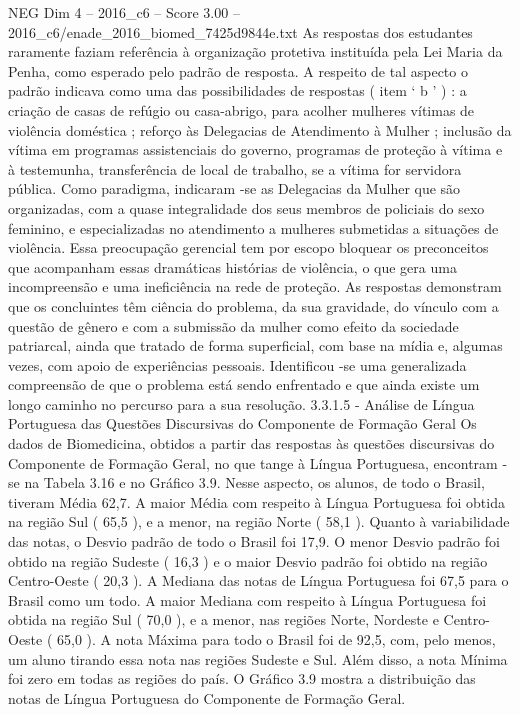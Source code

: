 \begin{textsample}{NEG Dim 4 – 2016\_c6 – Score 3.00 – 2016\_c6/enade\_2016\_biomed\_7425d9844e.txt}
As respostas dos estudantes raramente faziam referência à organização protetiva instituída pela Lei Maria da Penha, como esperado pelo padrão de resposta.
A respeito de tal aspecto o padrão indicava como uma das possibilidades de respostas ( item ‘ b ’ ) : a criação de casas de refúgio ou casa-abrigo, para acolher mulheres vítimas de violência doméstica ; reforço às Delegacias de Atendimento à Mulher ; inclusão da vítima em programas assistenciais do governo, programas de proteção à vítima e à testemunha, transferência de local de trabalho, se a vítima for servidora pública.
Como paradigma, indicaram -se as Delegacias da Mulher que são organizadas, com a quase integralidade dos seus membros de policiais do sexo feminino, e especializadas no atendimento a mulheres submetidas a situações de violência.
Essa preocupação gerencial tem por escopo bloquear os preconceitos que acompanham essas dramáticas histórias de violência, o que gera uma incompreensão e uma ineficiência na rede de proteção.
As respostas demonstram que os concluintes têm ciência do problema, da sua gravidade, do vínculo com a questão de gênero e com a submissão da mulher como efeito da sociedade patriarcal, ainda que tratado de forma superficial, com base na mídia e, algumas vezes, com apoio de experiências pessoais.
Identificou -se uma generalizada compreensão de que o problema está sendo enfrentado e que ainda existe um longo caminho no percurso para a sua resolução. 3.3.1.5 - Análise de Língua Portuguesa das Questões Discursivas do Componente de Formação Geral Os dados de Biomedicina, obtidos a partir das respostas às questões discursivas do Componente de Formação Geral, no que tange à Língua Portuguesa, encontram -se na Tabela 3.16 e no Gráfico 3.9.
Nesse aspecto, os alunos, de todo o Brasil, tiveram Média 62,7.
A maior Média com respeito à Língua Portuguesa foi obtida na região Sul ( 65,5 ), e a menor, na região Norte ( 58,1 ).
Quanto à variabilidade das notas, o Desvio padrão de todo o Brasil foi 17,9.
O menor Desvio padrão foi obtido na região Sudeste ( 16,3 ) e o maior Desvio padrão foi obtido na região Centro-Oeste ( 20,3 ).
A Mediana das notas de Língua Portuguesa foi 67,5 para o Brasil como um todo.
A maior Mediana com respeito à Língua Portuguesa foi obtida na região Sul ( 70,0 ), e a menor, nas regiões Norte, Nordeste e Centro-Oeste ( 65,0 ).
A nota Máxima para todo o Brasil foi de 92,5, com, pelo menos, um aluno tirando essa nota nas regiões Sudeste e Sul.
Além disso, a nota Mínima foi zero em todas as regiões do país.
O Gráfico 3.9 mostra a distribuição das notas de Língua Portuguesa do Componente de Formação Geral.

\end{textsample}
